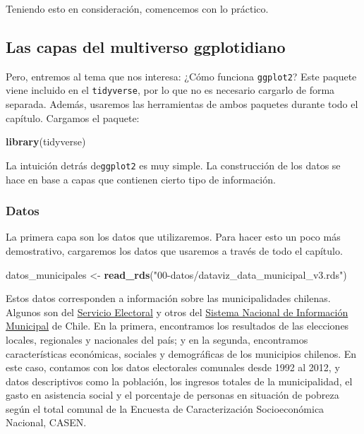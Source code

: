 \documentclass[]{book}
\newenvironment{Shaded}{\begin{snugshade}}{\end{snugshade}}
\newcommand{\KeywordTok}[1]{\textcolor[rgb]{0.13,0.29,0.53}{\textbf{#1}}}
\newcommand{\NormalTok}[1]{#1}
\newcommand{\StringTok}[1]{\textcolor[rgb]{0.31,0.60,0.02}{#1}}
\begin{document}
Teniendo esto en consideración, comencemos con lo práctico.

\hypertarget{las-capas-del-multiverso-ggplotidiano}{%
\subsection{Las capas del multiverso
ggplotidiano}\label{las-capas-del-multiverso-ggplotidiano}}

Pero, entremos al tema que nos interesa: ¿Cómo funciona
\texttt{ggplot2}? Este paquete viene incluido en el \texttt{tidyverse},
por lo que no es necesario cargarlo de forma separada. Además, usaremos
las herramientas de ambos paquetes durante todo el capítulo. Cargamos el
paquete:

\begin{Shaded}
\begin{Highlighting}[]
\KeywordTok{library}\NormalTok{(tidyverse)}
\end{Highlighting}
\end{Shaded}

La intuición detrás de\texttt{ggplot2} es muy simple. La construcción de
los datos se hace en base a capas que contienen cierto tipo de
información.

\hypertarget{datos}{%
\subsubsection{Datos}\label{datos}}

La primera capa son los datos que utilizaremos. Para hacer esto un poco
más demostrativo, cargaremos los datos que usaremos a través de todo el
capítulo.

\begin{Shaded}
\begin{Highlighting}[]
\NormalTok{datos_municipales <-}\StringTok{ }\KeywordTok{read_rds}\NormalTok{(}\StringTok{"00-datos/dataviz_data_municipal_v3.rds"}\NormalTok{)}
\end{Highlighting}
\end{Shaded}

Estos datos corresponden a información sobre las municipalidades
chilenas. Algunos son del \href{http://www.servel.cl}{Servicio
Electoral} y otros del
\href{http://datos.sinim.gov.cl/datos_municipales.php}{Sistema Nacional
de Información Municipal} de Chile. En la primera, encontramos los
resultados de las elecciones locales, regionales y nacionales del país;
y en la segunda, encontramos características económicas, sociales y
demográficas de los municipios chilenos. En este caso, contamos con los
datos electorales comunales desde 1992 al 2012, y datos descriptivos
como la población, los ingresos totales de la municipalidad, el gasto en
asistencia social y el porcentaje de personas en situación de pobreza
según el total comunal de la Encuesta de Caracterización Socioeconómica
Nacional, CASEN.
\end{document}
